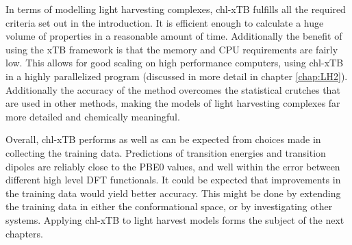 In terms of modelling light harvesting complexes, chl-xTB fulfills all the required
criteria set out in the introduction. It is efficient enough to calculate a huge
volume of properties in a reasonable amount of time. Additionally the benefit of
using the xTB framework is that the memory and CPU requirements are fairly low.
This allows for good scaling on high performance computers, using chl-xTB in a 
highly parallelized program (discussed in more detail in chapter \ref{chap:LH2}).
Additionally the accuracy of the method overcomes the statistical crutches that
are used in other methods, making the models of light harvesting complexes far more
detailed and chemically meaningful.

Overall, chl-xTB performs as well as can be expected from choices made in collecting
the training data. Predictions of transition energies and transition dipoles are
reliably close to the PBE0 values, and well within the error between different high 
level DFT functionals. It could be expected that improvements in the training data 
would yield better accuracy. This might be done by extending the training data in 
either the conformational space, or by investigating other systems. Applying chl-xTB 
to light harvest models forms the subject of the next chapters.


